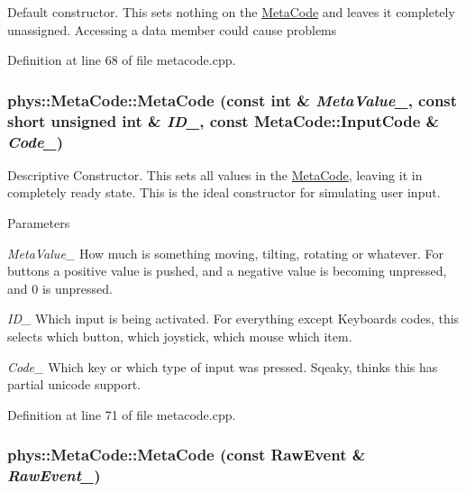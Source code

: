 Default constructor. This sets nothing on the \hyperlink{classphys_1_1MetaCode}{MetaCode} and leaves it completely unassigned. Accessing a data member could cause problems 

Definition at line 68 of file metacode.cpp.\hypertarget{classphys_1_1MetaCode_a05bcc50a09a9a5d19520dc258841f117}{
\subsubsection[{MetaCode}]{\setlength{\rightskip}{0pt plus 5cm}phys::MetaCode::MetaCode (const int \& {\em MetaValue\_\-}, \/  const short unsigned int \& {\em ID\_\-}, \/  const {\bf MetaCode::InputCode} \& {\em Code\_\-})}}
\label{da/dc9/classphys_1_1MetaCode_a05bcc50a09a9a5d19520dc258841f117}


Descriptive Constructor. This sets all values in the \hyperlink{classphys_1_1MetaCode}{MetaCode}, leaving it in completely ready state. This is the ideal constructor for simulating user input. 
\begin{DoxyParams}{Parameters}
\item[{\em MetaValue\_\-}]How much is something moving, tilting, rotating or whatever. For buttons a positive value is pushed, and a negative value is becoming unpressed, and 0 is unpressed. \item[{\em ID\_\-}]Which input is being activated. For everything except Keyboards codes, this selects which button, which joystick, which mouse which item. \item[{\em Code\_\-}]Which key or which type of input was pressed. Sqeaky, thinks this has partial unicode support. \end{DoxyParams}


Definition at line 71 of file metacode.cpp.\hypertarget{classphys_1_1MetaCode_ad9a618b5cc6f9d0cf0a4bc4f47bf98e8}{
\subsubsection[{MetaCode}]{\setlength{\rightskip}{0pt plus 5cm}phys::MetaCode::MetaCode (const RawEvent \& {\em RawEvent\_\-})}}
\label{da/dc9/classphys_1_1MetaCode_ad9a618b5cc6f9d0cf0a4bc4f47bf98e8}


